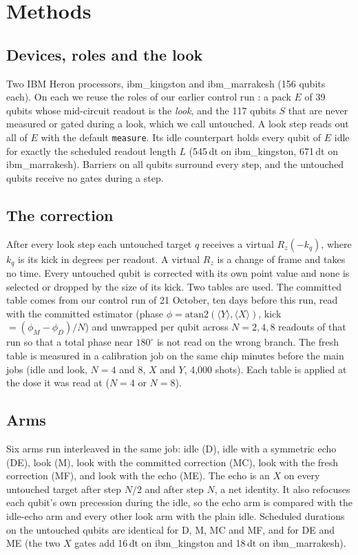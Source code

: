 \section{Methods}

\subsection{Devices, roles and the look}
Two IBM Heron processors, ibm\_kingston and ibm\_marrakesh (156 qubits each). On each we reuse the roles of our earlier control run
\cite{readout}: a pack $E$ of 39 qubits whose mid-circuit readout is the \emph{look}, and the 117 qubits $S$ that are never measured or
gated during a look, which we call untouched. A look step reads out all of $E$ with the default \texttt{measure}. Its idle counterpart holds
every qubit of $E$ idle for exactly the scheduled readout length $L$ (545\,dt on ibm\_kingston, 671\,dt on ibm\_marrakesh). Barriers on all qubits
surround every step, and the untouched qubits receive no gates during a step.

\subsection{The correction}
After every look step each untouched target $q$ receives a virtual $R_z(-k_q)$, where $k_q$ is its kick in degrees per readout. A virtual
$R_z$ is a change of frame and takes no time. Every untouched qubit is corrected with its own point value and none is selected or dropped
by the size of its kick. Two tables are used. The committed table comes from our control run of 21 October, ten days before this run, read with
the committed estimator (phase $\phi=\mathrm{atan2}(\langle Y\rangle,\langle X\rangle)$, kick $=(\phi_M-\phi_D)/N$) and unwrapped per qubit
across $N=2,4,8$ readouts of that run so that a total phase near $180^\circ$ is not read on the wrong branch. The fresh table is measured in a
calibration job on the same chip minutes before the main jobs (idle and look, $N=4$ and $8$, $X$ and $Y$, 4{,}000 shots). Each table is applied
at the dose it was read at ($N=4$ or $N=8$).

\subsection{Arms}
Six arms run interleaved in the same job: idle (D), idle with a symmetric echo (DE), look (M), look with the committed correction (MC), look with
the fresh correction (MF), and look with the echo (ME). The echo is an $X$ on every untouched target after step $N/2$ and after step $N$, a net
identity. It also refocuses each qubit's own precession during the idle, so the echo arm is compared with the idle-echo arm and every other
look arm with the plain idle. Scheduled durations on the untouched qubits are identical for D, M, MC and MF, and for DE and ME (the two $X$
gates add 16\,dt on ibm\_kingston and 18\,dt on ibm\_marrakesh).

